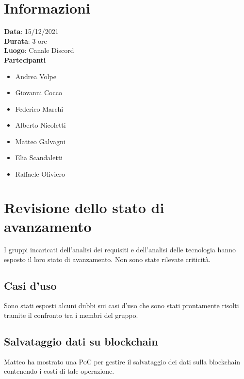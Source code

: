 \documentclass[a4paper, 12pt]{article}
\begin{document}
\makefrontpage

\section{Informazioni}
\textbf{Data}: 15/12/2021\\
\textbf{Durata}: 3 ore\\
\textbf{Luogo}: Canale Discord\\

\textbf{Partecipanti}
\begin{itemize}
	\item Andrea Volpe
	\item Giovanni Cocco
	\item Federico Marchi
	\item Alberto Nicoletti
	\item Matteo Galvagni
	\item Elia Scandaletti
	\item Raffaele Oliviero
\end{itemize}

\section{Revisione dello stato di avanzamento}

I gruppi incaricati dell'analisi dei requisiti e dell'analisi delle tecnologia hanno esposto il loro stato di avanzamento. Non sono state rilevate criticità.

\subsection{Casi d'uso}

Sono stati esposti alcuni dubbi sui casi d'uso che sono stati prontamente risolti tramite il confronto tra i membri del gruppo.

\subsection{Salvataggio dati su blockchain}

Matteo ha mostrato una PoC per gestire il salvataggio dei dati sulla blockchain contenendo i costi di tale operazione.
 
\end{document}
